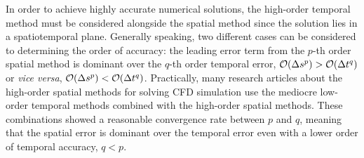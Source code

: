 In order to achieve highly accurate numerical solutions,
the high-order temporal method must be considered alongside the spatial method
since the solution lies in a spatiotemporal plane.
Generally speaking, two different cases can be considered to determining
the order of accuracy: the leading error term from the \( p \)-th order spatial method
is dominant over the \( q \)-th order temporal error, \( \mathcal{O}(\Delta s^{p}) > \mathcal{O}(\Delta t^{q}) \)
or \textit{vice versa}, \( \mathcal{O} (\Delta s^{p}) < \mathcal{O}(\Delta t^{q}) \).
Practically, many research articles about the high-order spatial methods for solving
CFD simulation
use the mediocre low-order temporal methods combined with the high-order spatial methods.
These combinations showed a reasonable convergence rate between \( p \) and \( q \),
meaning that the spatial error is dominant over the temporal error
even with a lower order of temporal accuracy, \( q < p \).

